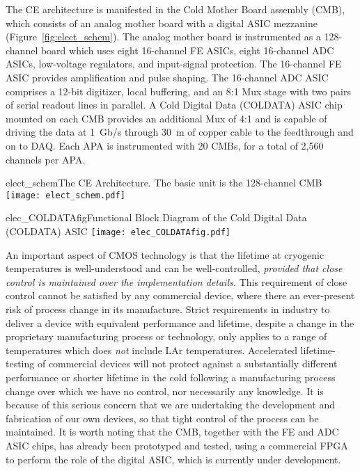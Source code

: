 The CE architecture is manifested in the Cold Mother Board assembly (CMB),
which consists of an analog mother board with a digital ASIC mezzanine (Figure~\ref{fig:elect_schem}).
The analog mother board is instrumented as a 128-channel board which uses eight 16-channel FE ASICs,
eight 16-channel ADC ASICs, low-voltage regulators, and input-signal protection.
The 16-channel FE ASIC provides amplification and pulse shaping.
The 16-channel ADC ASIC comprises a 12-bit digitizer, local buffering,
and an 8:1 Mux stage with two pairs of serial readout lines in parallel.
A Cold Digital Data (COLDATA) ASIC chip mounted on each CMB provides an additional Mux of 4:1 and
is capable of driving the data at 1~Gb/s through 30~m of copper cable to the feedthrough and on to DAQ. 
Each APA is instrumented with 20 CMBs, for a total of 2,560 channels per APA.
\begin{cdrfigure}{elect_schem}{The CE Architecture. The basic unit is the 128-channel CMB}
\texttt{[image: elect\_schem.pdf]}
\end{cdrfigure}
\begin{cdrfigure}{elec_COLDATAfig}{Functional Block Diagram of the Cold Digital Data (COLDATA) ASIC}
\texttt{[image: elec\_COLDATAfig.pdf]}
\end{cdrfigure}

An important aspect of CMOS technology is that the lifetime at cryogenic temperatures is well-understood and can be
well-controlled, {\em provided that close control is maintained over the implementation details.}
This requirement of close control cannot be satisfied by any commercial device,
where there an ever-present risk of process change in its manufacture.
Strict requirements in industry to deliver a device with equivalent performance and lifetime,
despite a change in the proprietary manufacturing process or technology,
only applies to a range of temperatures which does {\em not} include LAr temperatures.
Accelerated lifetime-testing of commercial devices will not protect against 
a substantially different performance or shorter lifetime in the cold following a manufacturing process change
over which we have no control, nor necessarily any knowledge.
It is because of this serious concern that we are undertaking the development and fabrication of our own devices, 
so that tight control of the process can be maintained.
It is worth noting that the CMB, together with the FE and ADC ASIC chips, has already been prototyped and tested,
using a commercial FPGA to perform the role of the digital ASIC,
which is currently under development.

